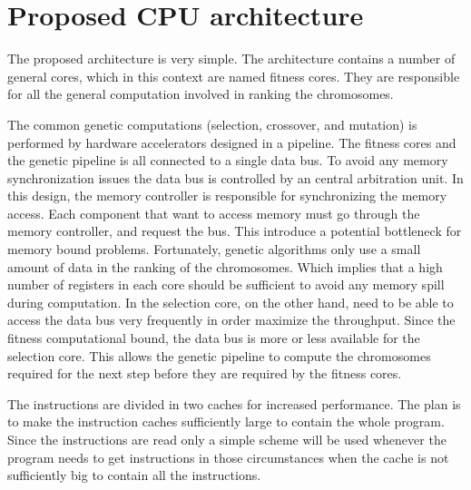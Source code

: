 \section {Proposed CPU architecture}

The proposed architecture is very simple.
The architecture contains a number of general cores, which in this context are named fitness cores.
They are responsible for all the general computation involved in ranking the chromosomes.

The common genetic computations (selection, crossover, and mutation) is performed by hardware accelerators designed in a pipeline.
The fitness cores and the genetic pipeline is all connected to a single data bus.
To avoid any memory synchronization issues the data bus is controlled by an central arbitration unit.
In this design, the memory controller is responsible for synchronizing the memory access.
Each component that want to access memory must go through the memory controller, and request the bus.
This introduce a potential bottleneck for memory bound problems.
Fortunately, genetic algorithms only use a small amount of data in the ranking of the chromosomes.
Which implies that a high number of registers in each core should be sufficient to avoid any memory spill during computation.
In the selection core, on the other hand, need to be able to access the data bus very frequently in order maximize the throughput.
Since the fitness computational bound, the data bus is more or less available for the selection core.
This allows the genetic pipeline to compute the chromosomes required for the next step before they are required by the fitness cores. 


The instructions are divided in two caches for increased performance.
The plan is to make the instruction caches sufficiently large to contain the whole program.
Since the instructions are read only a simple scheme will be used whenever the program needs to get instructions in those circumstances when the cache is not sufficiently big to contain all the instructions. 



